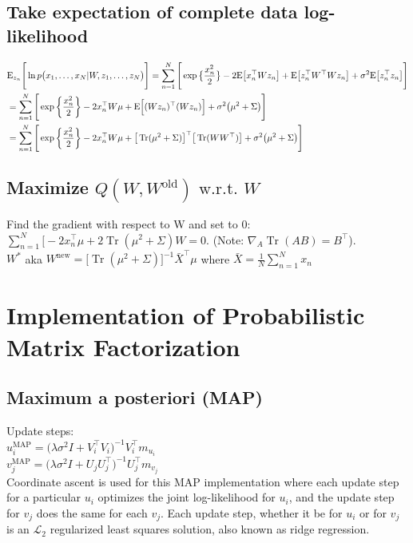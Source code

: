 \documentclass{article}
\DeclareMathOperator{\Tr}{Tr}
\begin{document}
\subsection{Take expectation of complete data log-likelihood}
\begin{align*}
\displaystyle  &\mathrm{E}_{z_n} \Bigg[ \ln p \big(x_1, \ldots, x_N | W, z_1, \ldots, z_N \big)\Bigg] = \sum_{n=1}^N \Bigg[ \exp\big\{\frac{x_n^2}{2} \big\} - 2 \mathrm{E} \big[ x_n^\top W z_n \big] + \mathrm{E} \big[ z_n^\top W^\top W z_n\big] + \sigma^2 \mathrm{E} \big[ z_n^\top z_n \big] \Bigg] \\
& =\sum_{n=1}^N \Bigg[ \exp\bigg\{\frac{x_n^2}{2} \bigg\} -2 x_n^\top W \mu + \mathrm{E} \Big[(Wz_n)^\top (Wz_n)\Big] + \sigma^2 \big(\mu^2 + \Sigma \big) \Bigg] \\
& = \sum_{n=1}^N \Bigg[ \exp\bigg\{\frac{x_n^2}{2} \bigg\} - 2 x_n^\top W \mu + \big[\Tr(\mu^2 + \Sigma)\big]^\top \big[\Tr(WW^\top) \big] + \sigma^2 \big(\mu^2 + \Sigma \big)  \Bigg]
\end{align*}

\subsection{Maximize $Q(W, W^{\text{old}}) \text{ w.r.t. } W$}
Find the gradient with respect to W and set to 0: \\
$\displaystyle \sum_{n=1}^N \Big[ -2x_n^\top\mu + 2\Tr(\mu^2 + \Sigma)W = 0$.
(Note:  $\nabla_A \Tr(AB) = B^\top$). \\
$W^*$ aka $W^{\text{new}} = \Big[\Tr(\mu^2 + \Sigma) \Big]^{-1} \bar{X}^\top \mu$ where $\bar{X} = \frac{1}{N} \sum_{n=1}^N x_n$
\section{Implementation of Probabilistic Matrix Factorization}
\subsection{Maximum a posteriori (MAP)}
Update steps: \\
$u_i^{\text{MAP}} = \big(\lambda \sigma^2 I + V_i^\top V_i \big)^{-1} V_i^\top m_{u_i}$\\
$v_j^{\text{MAP}} = \big(\lambda \sigma^2 I + U_j U_j^\top \big)^{-1} U_j^\top m_{v_j}$\\

\noindent
Coordinate ascent is used for this MAP implementation where each update step for a particular $u_i$ optimizes the joint log-likelihood for $u_i$, and the update step for $v_j$ does the same for each $v_j$.  Each update step, whether it be for $u_i$ or for $v_j$ is an $\mathcal{L}_2$ regularized least squares solution, also known as ridge regression.
\end{document}
